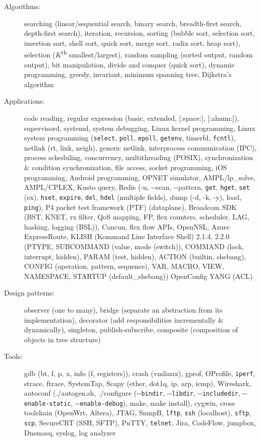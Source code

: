 \documentclass[letterpaper,11pt]{article}
\begin{document}
\begin{CJK}{UTF8}{gbsn}
\begin{description}
\item[Algorithms:] searching (linear/sequential search, binary search, breadth-first search, depth-first search), iteration, recursion,
sorting (bubble sort, selection sort, insertion sort, shell sort, quick sort, merge sort, radix sort, heap sort),
selection ($K$\textsuperscript{th} smallest/largest),
random sampling (sorted output, random output),
bit manipulation, divide and conquer (quick sort), dynamic programming, greedy, invariant, minimum spanning tree, Dijkstra's algorithm

\item[Applications:] code reading, regular expression (basic, extended, [:space:], [:alnum:]),
supervisord, systemd, system debugging, Linux kernel programming,
Linux system programming ({\tt select}, {\tt poll}, {\tt epoll}, {\tt getenv}, timerfd, {\tt fcntl}), netlink (rt, link, neigh), generic netlink,
interprocess communication (IPC), process scheduling,
concurrency, multithreading (POSIX), synchronization \& condition synchronization,
file access, socket programming,
%
iOS programming, Android programming,
OPNET simulator, AMPL/lp\_solve, AMPL/CPLEX, Kusto query,
%
Redis (-n, -{}-scan, -{}-pattern, {\tt get}, {\tt hget}, {\tt set} (ex), {\tt hset}, {\tt expire}, {\tt del}, {\tt hdel} (multiple fields),
dump (-d, -k, -y), load, {\tt ping}),
%
P4 packet test framework (PTF) (dataplane),
Broadcom SDK (BST, KNET, rx filter, QoS mapping, FP, flex counters, scheduler, LAG, hashing, logging (BSL)), Cancun, flex flow APIs, OpenNSL,
Azure ExpressRoute,
%
KLISH (Kommand Line Interface Shell) 2.1.4, 2.2.0 (PTYPE, SUBCOMMAND (value, mode (switch)), COMMAND (lock, interrupt, hidden), PARAM (test, hidden),
ACTION (builtin, shebang),
CONFIG (operation, pattern, sequence),
VAR, MACRO, VIEW, NAMESPACE, STARTUP (default\_shebang))
%
OpenConfig YANG (ACL)

\item[Design patterns:] observer (one to many), bridge (separate an abstraction from its implementation),
decorator (add responsibilities incrementally \& dynamically), singleton, publish-subscribe, composite (composition of objects in tree structure)

\item[Tools:] gdb (bt, f, p, x, info (f, registers)), crash (vmlinux), gprof, OProfile, {\tt iperf},
strace, ftrace, SystemTap,
Scapy (ether, dot1q, ip, arp, icmp), Wireshark, autoconf (./autogen.sh,
./configure (-{}-{\tt bindir}, -{}-{\tt libdir}, -{}-{\tt includedir}, -{}-{\tt enable-static}, -{}-{\tt enable-debug}),
make, make install), cygwin, cross toolchain (OpenWrt, Altera),
JTAG, SnmpB,
{\tt lftp}, {\tt ssh} (localhost), {\tt sftp}, {\tt scp}, SecureCRT (SSH, SFTP), PuTTY, {\tt telnet},
Jira, CodeFlow,
jumpbox, Dnsmasq, syslog, log analyzer


\end{description}
\end{CJK}
\end{document}
